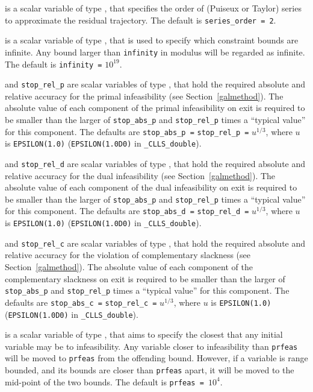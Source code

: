 \documentclass{galahad}
\newcommand{\packagename}{CLLS}
\newcommand{\fullpackagename}{\libraryname\_\packagename}
\begin{document}
\begin{description}
 is a scalar variable of type \integer, that
specifies the order of (Puiseux or Taylor) series to approximate the
residual trajectory. The default is {\tt series\_order = 2}.

 is a scalar variable of type \realdp, that is used to
specify which constraint bounds are infinite.
Any bound larger than {\tt infinity} in modulus will be regarded as infinite.
The default is {\tt infinity =} $10^{19}$.

 and {\tt stop\_rel\_p}
are scalar variables of type \realdp, that hold the
required absolute and relative accuracy for the primal infeasibility
(see Section~\ref{galmethod}).
The absolute value of each component of the primal infeasibility
on exit is required to be smaller than the larger of {\tt stop\_abs\_p} and
{\tt stop\_rel\_p} times a ``typical value'' for this component.
The defaults are {\tt stop\_abs\_p =} {\tt stop\_rel\_p =} $u^{1/3}$,
where $u$ is {\tt EPSILON(1.0)} ({\tt EPSILON(1.0D0)} in
{\tt \fullpackagename\_double}).

 and {\tt stop\_rel\_d}
are scalar variables of type \realdp, that hold the
required absolute and relative accuracy for the dual infeasibility
(see Section~\ref{galmethod}).
The absolute value of each component of the dual infeasibility
on exit is required to be smaller than the larger of {\tt stop\_abs\_p} and
{\tt stop\_rel\_p} times a ``typical value'' for this component.
The defaults are {\tt stop\_abs\_d =} {\tt stop\_rel\_d =} $u^{1/3}$,
where $u$ is {\tt EPSILON(1.0)} ({\tt EPSILON(1.0D0)} in
{\tt \fullpackagename\_double}).

 and {\tt stop\_rel\_c}
are scalar variables of type \realdp, that hold the
required absolute and relative accuracy
for the violation of complementary slackness
(see Section~\ref{galmethod}).
The absolute value of each component of the complementary slackness
on exit is required to be smaller than the larger of {\tt stop\_abs\_p} and
{\tt stop\_rel\_p} times a ``typical value'' for this component.
The defaults are {\tt stop\_abs\_c =} {\tt stop\_rel\_c =} $u^{1/3}$,
where $u$ is {\tt EPSILON(1.0)} ({\tt EPSILON(1.0D0)} in
{\tt \fullpackagename\_double}).

 is a scalar variable of type \realdp, that aims to specify
the closest that any initial variable may be to infeasibility. Any variable
closer to infeasibility than {\tt prfeas} will be moved to {\tt prfeas} from
the offending bound. However, if a variable is range bounded, and its bounds
are closer than {\tt prfeas} apart, it will be moved to the mid-point of the
two bounds.
The default is {\tt prfeas = $10^4$}.


\end{description}
\end{document}
